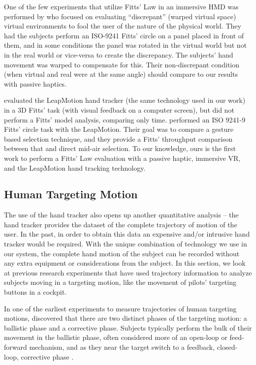 One of the few experiments that utilize Fitts' Law in an immersive HMD was performed by \citet{kohli_redirected_2012} who focused on evaluating ``discrepant'' (warped virtual space) virtual environments to fool the user of the nature of the physical world.
They had the subjects perform an ISO-9241 Fitts' circle on a panel placed in front of them, and in some conditions the panel was rotated in the virtual world but not in the real world or vice-versa to create the discrepancy.
The subjects' hand movement was warped to compensate for this.
Their non-discrepant condition (when virtual and real were at the same angle) should compare to our results with passive haptics.

\citet{coelho_pointing_2014} evaluated the LeapMotion hand tracker (the same technology used in our work) in a 3D Fitts' task (with visual feedback on a computer screen), but did not perform a Fitts' model analysis, comparing only time.
\citet{seixas_one_2015} performed an ISO 9241-9 Fitts' circle task with the LeapMotion.
Their goal was to compare a gesture based selection technique, and they provide a Fitts' throughput comparison between that and direct mid-air selection.
To our knowledge, ours is the first work to perform a Fitts' Law evaluation with a passive haptic, immersive VR, and the LeapMotion hand tracking technology.

\subsection{Human Targeting Motion}
\label{human-targeting-motion}

The use of the hand tracker also opens up another quantitative analysis -- the hand tracker provides the dataset of the complete trajectory of motion of the user.
In the past, in order to obtain this data an expensive and/or intrusive hand tracker would be required.
With the unique combination of technology we use in our system, the complete hand motion of the subject can be recorded without any extra equipment or considerations from the subject.
In this section, we look at previous research experiments that have used trajectory information to analyze subjects moving in a targeting motion, like the movement of pilots' targeting buttons in a cockpit.

In one of the earliest experiments to measure trajectories of human targeting motions, \citet{woodworth_accuracy_1899} discovered that there are two distinct phases of the targeting motion: a ballistic phase and a corrective phase.
Subjects typically perform the bulk of their movement in the ballistic phase, often considered more of an open-loop or feed-forward mechanism, and as they near the target switch to a feedback, closed-loop, corrective phase \citep{elliott_control_1999}.


